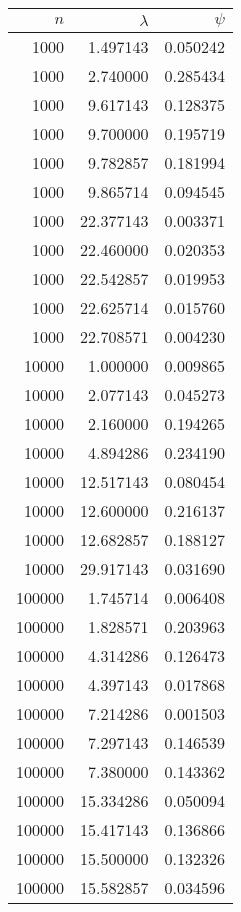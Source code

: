 \begin{tabular}{rrr}
\toprule
    $n$ &  $\lambda$ &    $\psi$ \\
\midrule
   1000 &   1.497143 &  0.050242 \\
   1000 &   2.740000 &  0.285434 \\
   1000 &   9.617143 &  0.128375 \\
   1000 &   9.700000 &  0.195719 \\
   1000 &   9.782857 &  0.181994 \\
   1000 &   9.865714 &  0.094545 \\
   1000 &  22.377143 &  0.003371 \\
   1000 &  22.460000 &  0.020353 \\
   1000 &  22.542857 &  0.019953 \\
   1000 &  22.625714 &  0.015760 \\
   1000 &  22.708571 &  0.004230 \\
  10000 &   1.000000 &  0.009865 \\
  10000 &   2.077143 &  0.045273 \\
  10000 &   2.160000 &  0.194265 \\
  10000 &   4.894286 &  0.234190 \\
  10000 &  12.517143 &  0.080454 \\
  10000 &  12.600000 &  0.216137 \\
  10000 &  12.682857 &  0.188127 \\
  10000 &  29.917143 &  0.031690 \\
 100000 &   1.745714 &  0.006408 \\
 100000 &   1.828571 &  0.203963 \\
 100000 &   4.314286 &  0.126473 \\
 100000 &   4.397143 &  0.017868 \\
 100000 &   7.214286 &  0.001503 \\
 100000 &   7.297143 &  0.146539 \\
 100000 &   7.380000 &  0.143362 \\
 100000 &  15.334286 &  0.050094 \\
 100000 &  15.417143 &  0.136866 \\
 100000 &  15.500000 &  0.132326 \\
 100000 &  15.582857 &  0.034596 \\
\bottomrule
\end{tabular}
